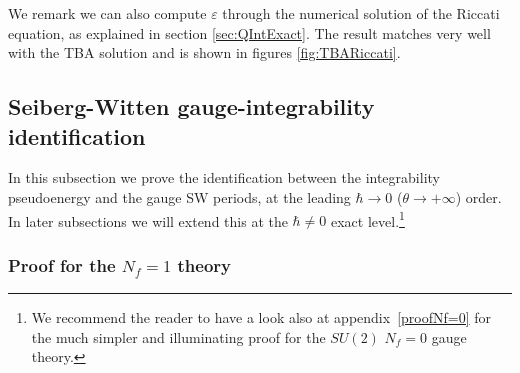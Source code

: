 \documentclass[11pt,a4paper]{elsarticle}
\def \th {\theta}
\def\th{\theta}
\numberwithin{figure}{section}
\numberwithin{table}{section}
\begin{document}
We remark we can also compute $\varepsilon$ through the numerical solution of the Riccati equation, as explained in section \ref{sec:QIntExact}. The result matches very well with the TBA solution and is shown in figures \ref{fig:TBARiccati}.




\subsection{Seiberg-Witten gauge-integrability identification}

In this subsection we prove the identification between the integrability pseudoenergy and the gauge SW periods, at the leading $\hbar\to 0$ ($\th\to +\infty$) order. In later subsections we will extend this at the $\hbar \neq 0$ exact level.\footnote{We recommend the reader to have a look also at appendix~\ref{proofNf=0} for the much simpler and illuminating proof for the $SU(2)$ $N_f=0$ gauge theory.} 

\subsubsection{Proof for the $N_f=1$ theory}
\end{document}
